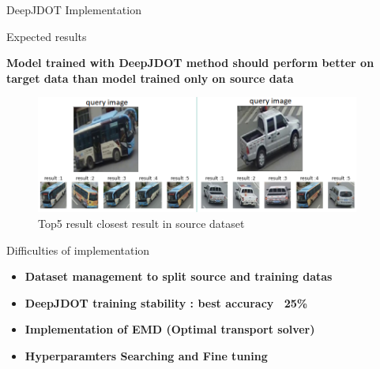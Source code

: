 \documentclass[final]{beamer}
\newlength{\sepmargin}
\newlength{\onecolwid}
\begin{document}
\begin{frame}[t]
\begin{columns}[t]
\begin{column}{\onecolwid}
\begin{block}{DeepJDOT Implementation}
 \end{block}
               
\begin{block}{Expected results}
 
    \textbf{Model trained with DeepJDOT method should perform better on target data than model trained only on source data}
\begin{figure}
    \includegraphics[width=1\linewidth]{images/resultJDOT.PNG}
    \caption{Top5 result closest result in source dataset}
\end{figure}
 
 \end{block} 
 
\begin{block}{Difficulties of implementation}
    \begin{itemize}
      \item \textbf{Dataset management to split source and training datas}
      \item \textbf{DeepJDOT training stability : best accuracy ~25\% }
      \item \textbf{Implementation of EMD (Optimal transport solver)}
      \item \textbf{Hyperparamters Searching and Fine tuning}
    \end{itemize}
\end{block} 
 
\end{column}%
\begin{column}{\sepmargin} \end{column}
\end{columns} 
\end{frame} 
	
\end{document}
